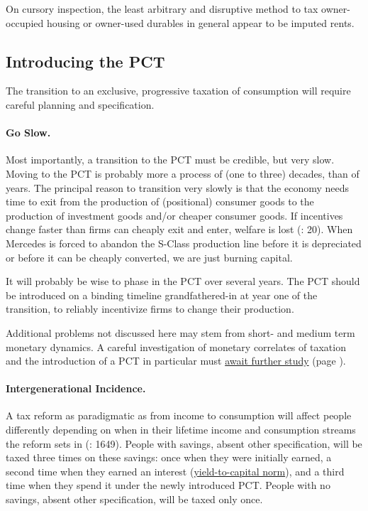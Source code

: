 On cursory inspection, the least arbitrary and disruptive method to tax owner-occupied housing or owner-used durables in general appear to be imputed rents.

\subsection{Introducing the PCT} The transition to an exclusive, progressive taxation of consumption will require careful planning and specification.

\paragraph{Go Slow.}  \label{sec:GoSlow} Most importantly, a transition to the PCT must be credible, but very slow. Moving to the PCT is probably more a process of (one to three) decades, than of years. The principal reason to transition very slowly is that the economy needs time to exit from the production of (positional) consumer goods to the production of investment goods and/or cheaper consumer goods. If incentives change faster than firms can cheaply exit and enter, welfare is lost (\citealt{Seidman1997}: 20). When Mercedes is forced to abandon the S-Class production line before it is depreciated or before it can be cheaply converted, we are just burning capital.

It will probably be wise to phase in the PCT over several years. The PCT should be introduced on a binding timeline grandfathered-in at year one of the transition, to reliably incentivize firms to change their production.

Additional problems not discussed here may stem from short- and medium term monetary dynamics. A careful investigation of monetary correlates of taxation and the introduction of a PCT in particular must \hyperref[sec:LooseEnds]{await further study} (page \pageref{sec:LooseEnds}).

\paragraph{Intergenerational Incidence.}  \label{sec:IntergenerationalIncidence} A tax reform as paradigmatic as from income to consumption will affect people differently depending on when in their lifetime income and consumption streams the reform sets in (\citealt{Graetz2009}: 1649). People with savings, absent other specification, will be taxed three times on these savings: once when they were initially earned, a second time when they earned an interest (\hyperref[sec:Y2C]{yield-to-capital norm}), and a third time when they spend it under the newly introduced PCT. People with no savings, absent other specification, will be taxed only once.


